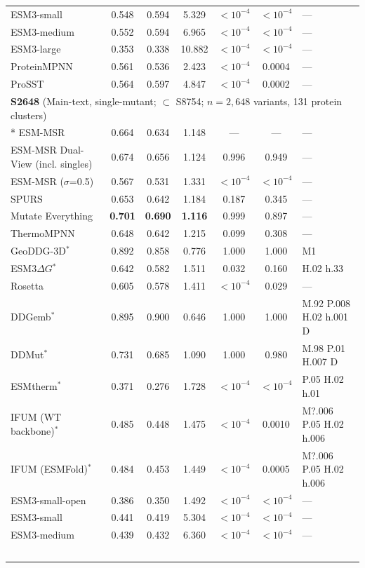 {\begin{longtable}{lcccccl}
ESM3-small & 0.548 & 0.594 & 5.329 & $<10^{-4}$ & $<10^{-4}$ & --- \\
ESM3-medium & 0.552 & 0.594 & 6.965 & $<10^{-4}$ & $<10^{-4}$ & --- \\
ESM3-large & 0.353 & 0.338 & 10.882 & $<10^{-4}$ & $<10^{-4}$ & --- \\
ProteinMPNN & 0.561 & 0.536 & 2.423 & $<10^{-4}$ & 0.0004 & --- \\
ProSST & 0.564 & 0.597 & 4.847 & $<10^{-4}$ & 0.0002 & --- \\
\midrule
\multicolumn{7}{l}{\textbf{S2648} (Main-text, single-mutant; $\subset$ S8754; $n=2,648$ variants, 131 protein clusters)} \\*
\midrule
ESM-MSR & 0.664 & 0.634 & 1.148 & --- & --- & --- \\
ESM-MSR Dual-View (incl. singles) & 0.674 & 0.656 & 1.124 & 0.996 & 0.949 & --- \\
ESM-MSR ($\sigma$=0.5) & 0.567 & 0.531 & 1.331 & $<10^{-4}$ & $<10^{-4}$ & --- \\
SPURS & 0.653 & 0.642 & 1.184 & 0.187 & 0.345 & --- \\
Mutate Everything & \textbf{0.701} & \textbf{0.690} & \textbf{1.116} & 0.999 & 0.897 & --- \\
ThermoMPNN & 0.648 & 0.642 & 1.215 & 0.099 & 0.308 & --- \\
GeoDDG-3D$^*$ & 0.892 & 0.858 & 0.776 & 1.000 & 1.000 & M1 \\
ESM3$\Delta G$$^*$ & 0.642 & 0.582 & 1.511 & 0.032 & 0.160 & H.02 h.33 \\
Rosetta & 0.605 & 0.578 & 1.411 & $<10^{-4}$ & 0.029 & --- \\
DDGemb$^*$ & 0.895 & 0.900 & 0.646 & 1.000 & 1.000 & M.92 P.008 H.02 h.001 D \\
DDMut$^*$ & 0.731 & 0.685 & 1.090 & 1.000 & 0.980 & M.98 P.01 H.007 D \\
ESMtherm$^*$ & 0.371 & 0.276 & 1.728 & $<10^{-4}$ & $<10^{-4}$ & P.05 H.02 h.01 \\
IFUM (WT backbone)$^*$ & 0.485 & 0.448 & 1.475 & $<10^{-4}$ & 0.0010 & M?.006 P.05 H.02 h.006 \\
IFUM (ESMFold)$^*$ & 0.484 & 0.453 & 1.449 & $<10^{-4}$ & 0.0005 & M?.006 P.05 H.02 h.006 \\
ESM3-small-open & 0.386 & 0.350 & 1.492 & $<10^{-4}$ & $<10^{-4}$ & --- \\
ESM3-small & 0.441 & 0.419 & 5.304 & $<10^{-4}$ & $<10^{-4}$ & --- \\
ESM3-medium & 0.439 & 0.432 & 6.360 & $<10^{-4}$ & $<10^{-4}$ & --- \\
$$
\end{longtable}}
